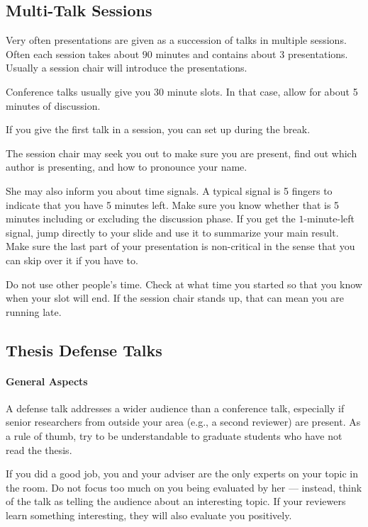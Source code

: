 \documentclass[12pt]{article}
\begin{document}
\subsection{Multi-Talk Sessions}

Very often presentations are given as a succession of talks in multiple sessions.
Often each session takes about $90$ minutes and contains about $3$ presentations.
Usually a session chair will introduce the presentations.
\medskip

Conference talks usually give you 30 minute slots.
In that case, allow for about 5 minutes of discussion.
\medskip

If you give the first talk in a session, you can set up during the break.
\medskip

The session chair may seek you out to make sure you are present, find out which author is presenting, and how to pronounce your name.

She may also inform you about time signals.
A typical signal is 5 fingers to indicate that you have 5 minutes left.
Make sure you know whether that is 5 minutes including or excluding the discussion phase.
If you get the $1$-minute-left signal, jump directly to your slide and use it to summarize your main result.
Make sure the last part of your presentation is non-critical in the sense that you can skip over it if you have to.
\medskip

Do not use other people's time.
Check at what time you started so that you know when your slot will end.
If the session chair stands up, that can mean you are running late.

\subsection{Thesis Defense Talks}

\paragraph{General Aspects}
A defense talk addresses a wider audience than a conference talk, especially if senior researchers from outside your area (e.g., a second reviewer) are present.
As a rule of thumb, try to be understandable to graduate students who have not read the thesis.
\medskip

If you did a good job, you and your adviser are the only experts on your topic in the room.
Do not focus too much on you being evaluated by her --- instead, think of the talk as telling the audience about an interesting topic.
If your reviewers learn something interesting, they will also evaluate you positively. 
\medskip
\end{document}
